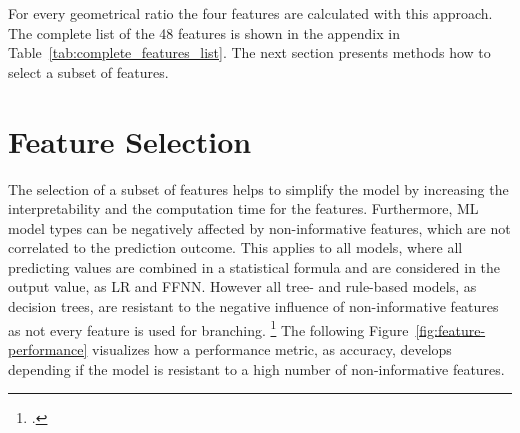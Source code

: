 For every geometrical ratio the four features are calculated with this approach.
The complete list of the 48 features is shown in the appendix in Table~\ref{tab:complete_features_list}. The next section
presents methods how to select a subset of features.

\section{Feature Selection}
\label{sec:feature_engineering}

The selection of a subset of features helps to simplify the model by increasing the interpretability and the computation time
for the features. Furthermore, \gls{ML} model types can be negatively affected by non-informative features, which are not correlated
to the prediction outcome. This applies to all models, where all predicting values are combined in a statistical formula
and are considered in the output value, as \gls{LR} and \gls{FFNN}. However all tree- and rule-based models, as decision trees, are resistant
to the negative influence of non-informative features as not every feature is used for branching. \footcite[cf.][pp. 487--489]{kuhn_applied_2016}
The following Figure~\ref{fig:feature-performance} visualizes how a performance metric, as accuracy, develops depending if the model is
resistant to a high number of non-informative features.


